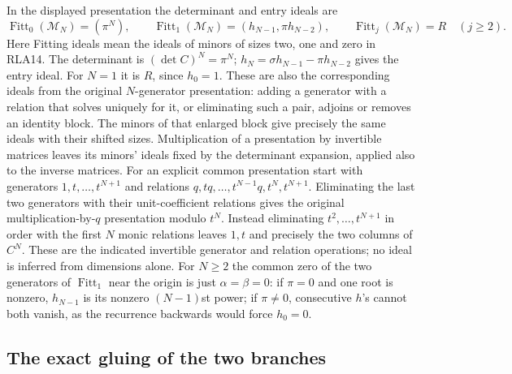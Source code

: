 \documentclass[11pt]{article}
\begin{document}
In the displayed presentation the determinant and entry ideals are
\[
 \operatorname{Fitt}_0(\mathcal M_N)=(\pi^N),\qquad
 \operatorname{Fitt}_1(\mathcal M_N)
   =(h_{N-1},\pi h_{N-2}),\qquad
 \operatorname{Fitt}_j(\mathcal M_N)=R\quad(j\ge2).
 \tag{RLA15}
\]
Here Fitting ideals mean the ideals of minors of sizes two, one
and zero in RLA14.  The determinant is $(\det C)^N=\pi^N$;
$h_N=\sigma h_{N-1}-\pi h_{N-2}$ gives the entry ideal.
For $N=1$ it is $R$, since $h_0=1$.
These are also the corresponding ideals from the original
$N$-generator presentation: adding a generator with a relation that
solves uniquely for it, or eliminating such a pair, adjoins or removes
an identity block.  The minors of that enlarged block give precisely
the same ideals with their shifted sizes.  Multiplication of a
presentation by invertible matrices leaves its minors' ideals fixed
by the determinant expansion, applied also to the inverse matrices.
For an explicit common presentation start with generators
$1,t,\ldots,t^{N+1}$ and relations
$q,tq,\ldots,t^{N-1}q,t^N,t^{N+1}$.
Eliminating the last two generators with their unit-coefficient
relations gives the original multiplication-by-$q$ presentation
modulo $t^N$.  Instead eliminating $t^2,\ldots,t^{N+1}$ in order
with the first $N$ monic relations leaves $1,t$ and precisely the
two columns of $C^N$.  These are the indicated invertible
generator and relation operations; no ideal is inferred from
dimensions alone.
For $N\ge2$ the common zero of the two generators of
$\operatorname{Fitt}_1$ near the origin is just $\alpha=\beta=0$:
if $\pi=0$ and one root is nonzero, $h_{N-1}$ is its nonzero
$(N-1)$st power; if $\pi\ne0$, consecutive $h$'s cannot both vanish,
as the recurrence backwards would force $h_0=0$.

\subsection{The exact gluing of the two branches}
\end{document}

